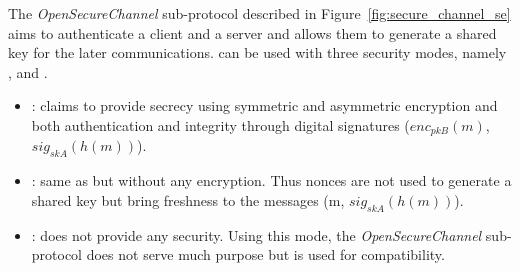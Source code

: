 \newcommand{\gereq}{GEReq}
\newcommand{\geres}{GERes}
\newcommand{\oscreq}{OSCReq}
\newcommand{\oscres}{OSCRes}


The {\em OpenSecureChannel} sub-protocol described in
Figure~\ref{fig:secure_channel_se} aims to authenticate a client and
a server and allows them to generate a shared key for the later communications.
\opcua can be used with three security modes, namely {\em \smn}, {\em \sms} and
{\em \smse}.
\vspace{-.5em}
\begin{itemize}
    \item {\em \smse}: claims to provide secrecy using symmetric and
      asymmetric encryption and both authentication and integrity
      through digital signatures (\eg $enc_{pkB}(m)$, $sig_{skA}(h(m))$).
  \item {\em \sms}: same as {\em \smse} but without any encryption.  Thus
      nonces are not used to generate a shared key but bring freshness
      to the messages (\eg m, $sig_{skA}(h(m))$).
  \item {\em \smn}: does not provide any security.  Using this mode, the
      {\em OpenSecureChannel} sub-protocol does not serve much
      purpose but is used for compatibility.
\end{itemize}

